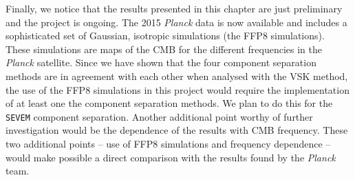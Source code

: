 Finally, we notice that %
the results presented in this chapter are just preliminary and the project is ongoing. The 2015 \textit{Planck} data is now available and includes a sophisticated set of Gaussian, isotropic simulations  (the FFP8 simulations). These simulations are maps of the CMB for the different frequencies in the \textit{Planck} satellite. Since we have shown that the four component separation methods are in agreement with each other when analysed with the VSK method, the use of the FFP8 simulations in this project would require the implementation of at least one the component separation methods. We plan to do this for the \texttt{SEVEM} component separation. Another additional point worthy of further investigation would be the dependence of the results with CMB frequency. These two additional points -- use of FFP8 simulations and frequency dependence -- would make possible a direct comparison with the results found by the \textit{Planck} team. 
